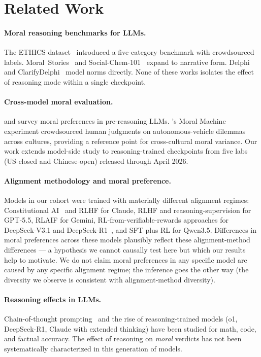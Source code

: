 \documentclass{article}
\begin{document}
\section{Related Work}

\paragraph{Moral reasoning benchmarks for LLMs.}
The ETHICS dataset~\citep{hendrycks2021ethics} introduced a five-category benchmark with crowdsourced labels.  Moral~Stories~\citep{emelin2021moralstories} and Social-Chem-101~\citep{forbes2020socialchem} expand to narrative form.  Delphi~\citep{jiang2021delphi} and ClarifyDelphi~\citep{pyatkin2023clarifydelphi} model norms directly.  None of these works isolates the effect of reasoning mode within a single checkpoint.

\paragraph{Cross-model moral evaluation.}
\citet{scherrer2023moral} and \citet{abdulhai2023moral} survey moral preferences in pre-reasoning LLMs. \citet{awad2018moral}'s Moral Machine experiment crowdsourced human judgments on autonomous-vehicle dilemmas across cultures, providing a reference point for cross-cultural moral variance. Our work extends model-side study to reasoning-trained checkpoints from five labs (US-closed and Chinese-open) released through April 2026.

\paragraph{Alignment methodology and moral preference.}
Models in our cohort were trained with materially different alignment regimes: Constitutional AI~\citep{bai2022constitutional} and RLHF for Claude, RLHF and reasoning-supervision for GPT-5.5, RLAIF for Gemini, RL-from-verifiable-rewards approaches for DeepSeek-V3.1 and DeepSeek-R1~\citep{guo2025deepseekr1}, and SFT plus RL for Qwen3.5. Differences in moral preferences across these models plausibly reflect these alignment-method differences --- a hypothesis we cannot causally test here but which our results help to motivate. We do not claim moral preferences in any specific model are caused by any specific alignment regime; the inference goes the other way (the diversity we observe is consistent with alignment-method diversity).

\paragraph{Reasoning effects in LLMs.}
Chain-of-thought prompting~\citep{wei2022cot} and the rise of reasoning-trained models (o1, DeepSeek-R1, Claude with extended thinking) have been studied for math, code, and factual accuracy. The effect of reasoning on \emph{moral} verdicts has not been systematically characterized in this generation of models.
\end{document}
